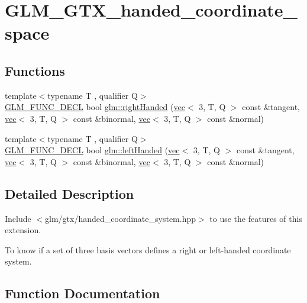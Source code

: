 \hypertarget{group__gtx__handed__coordinate__space}{}\section{G\+L\+M\+\_\+\+G\+T\+X\+\_\+handed\+\_\+coordinate\+\_\+space}
\label{group__gtx__handed__coordinate__space}
\subsection*{Functions}
\begin{DoxyCompactItemize}
\item 
{\footnotesize template$<$typename T , qualifier Q$>$ }\\\hyperlink{setup_8hpp_ab2d052de21a70539923e9bcbf6e83a51}{G\+L\+M\+\_\+\+F\+U\+N\+C\+\_\+\+D\+E\+CL} bool \hyperlink{group__gtx__handed__coordinate__space_ga99386a5ab5491871b947076e21699cc8}{glm\+::right\+Handed} (\hyperlink{structglm_1_1vec}{vec}$<$ 3, T, Q $>$ const \&tangent, \hyperlink{structglm_1_1vec}{vec}$<$ 3, T, Q $>$ const \&binormal, \hyperlink{structglm_1_1vec}{vec}$<$ 3, T, Q $>$ const \&normal)
\item 
{\footnotesize template$<$typename T , qualifier Q$>$ }\\\hyperlink{setup_8hpp_ab2d052de21a70539923e9bcbf6e83a51}{G\+L\+M\+\_\+\+F\+U\+N\+C\+\_\+\+D\+E\+CL} bool \hyperlink{group__gtx__handed__coordinate__space_ga6f1bad193b9a3b048543d1935cf04dd3}{glm\+::left\+Handed} (\hyperlink{structglm_1_1vec}{vec}$<$ 3, T, Q $>$ const \&tangent, \hyperlink{structglm_1_1vec}{vec}$<$ 3, T, Q $>$ const \&binormal, \hyperlink{structglm_1_1vec}{vec}$<$ 3, T, Q $>$ const \&normal)
\end{DoxyCompactItemize}


\subsection{Detailed Description}
Include $<$glm/gtx/handed\+\_\+coordinate\+\_\+system.\+hpp$>$ to use the features of this extension.

To know if a set of three basis vectors defines a right or left-\/handed coordinate system. 

\subsection{Function Documentation}
\mbox{\label{group__gtx__handed__coordinate__space_ga6f1bad193b9a3b048543d1935cf04dd3}} 
